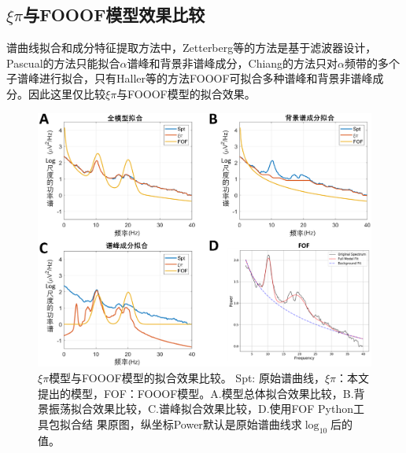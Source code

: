 \subsection{\texorpdfstring{$\xi\pi$}{ξπ}与FOOOF模型效果比较}
谱曲线拟合和成分特征提取方法中，Zetterberg等的方法是基于滤波器设计，Pascual的方法只能拟合$\alpha$谱峰和背景非谱峰成分，Chiang的方法只对$\alpha$频带的多个子谱峰进行拟合，只有Haller等的方法FOOOF可拟合多种谱峰和背景非谱峰成分。因此这里仅比较$\xi\pi$与FOOOF模型的拟合效果。
\begin{figure}[!h]
	\includegraphics[width=15cm]{pic/xipi/comp.png}
	\caption{$\xi\pi$模型与FOOOF模型的拟合效果比较。 Spt: 原始谱曲线，$\xi\pi$：本文提出的模型，FOF：FOOOF模型。A.模型总体拟合效果比较，B.背景振荡拟合效果比较，C.谱峰拟合效果比较，D.使用FOF Python工具包拟合结
	果原图，纵坐标Power默认是原始谱曲线求$\log_{10}$后的值。}
	\label{7:comp}
\end{figure}

